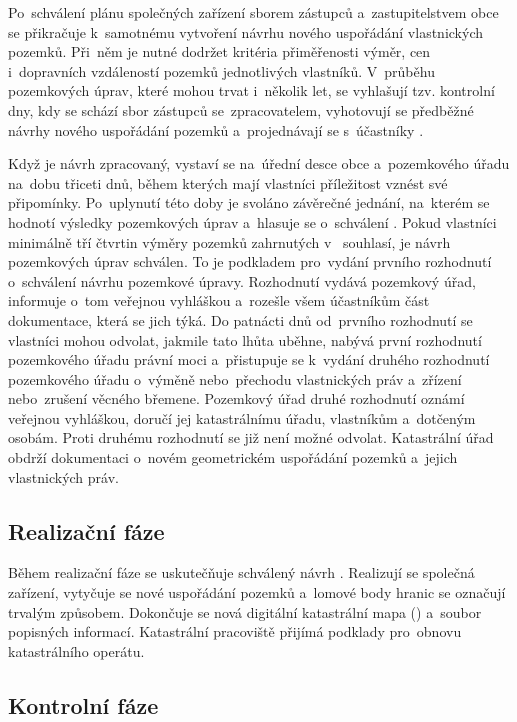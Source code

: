 Po~schválení plánu společných zařízení sborem zástupců a~zastupitelstvem obce se přikračuje k~samotnému vytvoření návrhu nového uspořádání vlastnických pozemků. Při~něm je nutné dodržet kritéria přiměřenosti výměr, cen i~dopravních vzdáleností pozemků jednotlivých vlastníků. V~průběhu pozemkových úprav, které mohou trvat i~několik let, se vyhlašují tzv. kontrolní dny, kdy se schází sbor zástupců se~zpraco\-vatelem, vyhotovují se předběžné návrhy nového uspořádání pozemků a~projednávají se s~účastníky .

Když je návrh zpracovaný, vystaví se na~úřední desce obce a~pozemkového úřadu na~dobu třiceti dnů, během kterých mají vlastníci příležitost vznést své připomínky. Po~uplynutí této doby je svoláno závěrečné jednání, na~kterém se hodnotí výsledky pozemkových úprav a~hlasuje se o~schválení . Pokud vlastníci minimálně tří čtvrtin výměry pozemků zahrnutých v~ souhlasí, je návrh pozemkových úprav schválen. To je podkladem pro~vydání prvního rozhodnutí o~schválení návrhu pozemkové úpravy. Rozhodnutí vydává pozemkový úřad, informuje o~tom veřejnou vyhláškou a~rozešle všem účastníkům část dokumentace, která se jich týká. Do patnácti dnů od~prvního rozhodnutí se vlastníci mohou odvolat, jakmile tato lhůta uběhne, nabývá první rozhodnutí pozemkového úřadu právní moci a~přistupuje se k~vydání druhého rozhodnutí pozemkového úřadu o~výměně nebo~přechodu vlastnických práv a~zřízení nebo~zrušení věcného břemene. Pozemkový úřad druhé rozhodnutí oznámí veřejnou vyhláškou, doručí jej katastrálnímu úřadu, vlastníkům a~dotčeným osobám. Proti druhému rozhodnutí se již není možné odvolat. Kata\-strální úřad obdrží dokumentaci o~novém geometrickém uspořádání pozemků a~jejich vlastnických práv.

\subsection{Realizační fáze}
\label{realizacni_faze}

Během realizační fáze se uskutečňuje schválený návrh . Realizují se společná zařízení, vytyčuje se nové uspořádání pozemků a~lomové body hranic se označují trvalým způsobem. Dokončuje se nová digitální katastrální mapa () a~soubor popisných informací. Katastrální pracoviště přijímá podklady pro~obnovu katastrálního operátu.

\subsection{Kontrolní fáze}
\label{kontrolni_faze}

